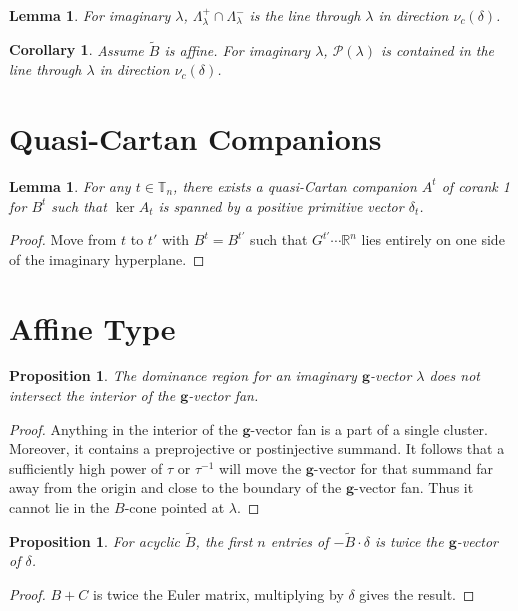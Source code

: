 \documentclass{amsart}
\newtheorem{corollary}[theorem]{Corollary}
\newtheorem{lemma}[theorem]{Lemma}
\newtheorem{proposition}[theorem]{Proposition}
\numberwithin{theorem}{section}
\newcommand{\bfg}{\boldsymbol{g}}
\newcommand{\cP}{\mathcal{P}}
\newcommand{\RR}{\mathbb{R}}
\newcommand{\TT}{\mathbb{T}}
\begin{document}
  \begin{lemma}
    For imaginary $\lambda$, $\Lambda^+_\lambda\cap\Lambda^-_\lambda$ is the line through $\lambda$ in direction $\nu_c(\delta)$.
  \end{lemma}

  \begin{corollary}
    Assume $\tilde B$ is affine.
    For imaginary $\lambda$, $\cP(\lambda)$ is contained in the line through $\lambda$ in direction $\nu_c(\delta)$. 
  \end{corollary}


  \section{Quasi-Cartan Companions}

  \begin{lemma}
    For any $t\in\TT_n$, there exists a quasi-Cartan companion $A^t$ of corank 1 for $B^t$ such that $\ker A_t$ is spanned by a positive primitive vector $\delta_t$.
  \end{lemma}
  \begin{proof}
    Move from $t$ to $t'$ with $B^t=B^{t'}$ such that $G^{t'}\cdots\RR^n$ lies entirely on one side of the imaginary hyperplane.
  \end{proof}

  \section{Affine Type}
  
  \begin{proposition}
    The dominance region for an imaginary $\bfg$-vector $\lambda$ does not intersect the interior of the $\bfg$-vector fan.
  \end{proposition}
  \begin{proof}
    Anything in the interior of the $\bfg$-vector fan is a part of a single cluster.
    Moreover, it contains a preprojective or postinjective summand.
    It follows that a sufficiently high power of $\tau$ or $\tau^{-1}$ will move the $\bfg$-vector for that summand far away from the origin and close to the boundary of the $\bfg$-vector fan.
    Thus it cannot lie in the $B$-cone pointed at $\lambda$.
  \end{proof}

  \begin{proposition}
    For acyclic $\tilde B$, the first $n$ entries of $-\tilde B\cdot\delta$ is twice the $\bfg$-vector of $\delta$.
  \end{proposition}
  \begin{proof}
    $B+C$ is twice the Euler matrix, multiplying by $\delta$ gives the result.
  \end{proof}
\end{document}
